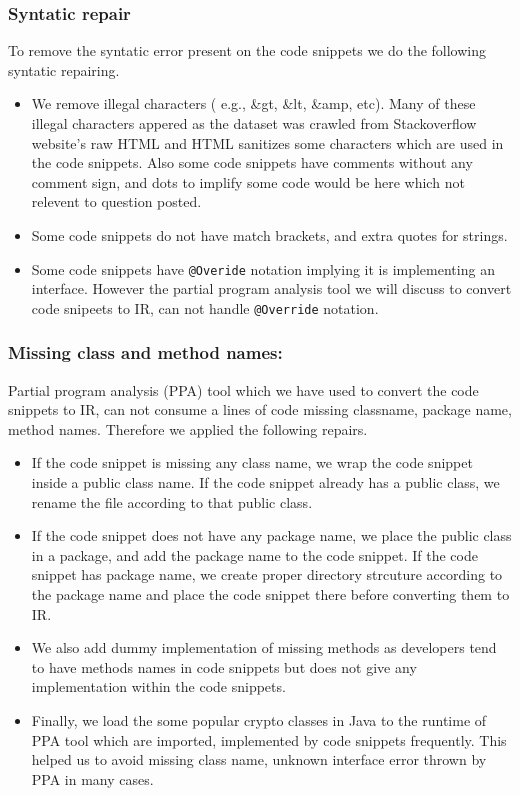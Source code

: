 \subsubsection{Syntatic repair}
To remove the syntatic error present on the code snippets we do the following syntatic repairing.
  \begin{itemize}
    \item We remove illegal characters ( e.g., \&gt, \&lt, \&amp, etc). Many of these illegal characters appered as the dataset was crawled from Stackoverflow website's raw HTML and HTML sanitizes some characters which are used in the code snippets. Also some code snippets have comments without any comment sign, and dots to implify some code would be here which not relevent to question posted.    
    \item Some code snippets do not have match brackets, and extra quotes for strings. 
    \item Some code snippets have \texttt{@Overide} notation implying it is implementing an interface. However the partial program analysis tool we will discuss to convert code snipeets to IR, can not handle \texttt{@Override} notation.
  \end{itemize}
     

\subsubsection{Missing class and method names:}
Partial program analysis (PPA) tool which we have used to convert the code snippets to IR, can not consume a lines  of code missing classname, package name, method names. Therefore we applied the following repairs. 
\begin{itemize}
\item If the code snippet is missing any class name, we wrap the code snippet inside a public class name. If the code snippet already has a public class, we rename the file according to that public class.
\item If the code snippet does not have any package name, we place the public class in a package, and add the package name to the code snippet. If the code snippet has package name, we create proper directory strcuture according to the package name and place the code snippet there before converting them to IR. 
\item We also add dummy implementation of missing methods as developers tend to have methods names  in code snippets but does not give any implementation within the code snippets.
\item Finally, we load the some popular crypto classes in Java to the runtime of PPA tool which are imported, implemented by code snippets frequently. This helped us to avoid missing class name, unknown interface error thrown by PPA in many cases.  
 
\end{itemize}
       
